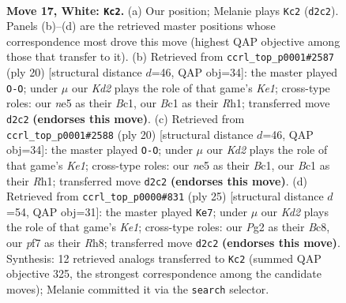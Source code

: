 \documentclass[11pt]{article}
\begin{document}
\clearpage

\begin{figure}[p]\centering
\begin{subfigure}{0.46\textwidth}\centering
\resizebox{\linewidth}{!}{%
\newchessgame
\chessboard[
  setfen={r1b1kb1r/p4p2/4p3/1p1pn1Pp/8/6N1/PP1K2PP/R1B3NR w kq - 0 17},
  showmover=false,
  pgfstyle=straightmove, color=movearrow, markmove={d2-c2}
]}
\caption{}
\end{subfigure}\hfill
\begin{subfigure}{0.46\textwidth}\centering
\resizebox{\linewidth}{!}{%
\newchessgame
\chessboard[
  setfen={r1b1kb1r/p3pppp/1np5/4N3/8/2N5/PPP2PPP/R1B1K2R w KQkq - 0 11},
  showmover=false,
  pgfstyle=straightmove, color=movearrow, markmove={e1-g1}
]}
\caption{}
\end{subfigure}
\\[4pt]
\begin{subfigure}{0.46\textwidth}\centering
\resizebox{\linewidth}{!}{%
\newchessgame
\chessboard[
  setfen={r1b1kb1r/p3pppp/1np5/4N3/8/2N5/PPP2PPP/R1B1K2R w KQkq - 0 11},
  showmover=false,
  pgfstyle=straightmove, color=movearrow, markmove={e1-g1}
]}
\caption{}
\end{subfigure}\hfill
\begin{subfigure}{0.46\textwidth}\centering
\resizebox{\linewidth}{!}{%
\newchessgame
\chessboard[
  setfen={r1b1k2r/pp1n1ppp/4p3/3pP3/3N1P2/8/PPP3PP/R3KB1R b KQkq - 0 13},
  showmover=false,
  pgfstyle=straightmove, color=movearrow, markmove={e8-e7}
]}
\caption{}
\end{subfigure}
\caption{\textbf{Move 17, White: \texttt{Kc2}.} (a) Our position; Melanie plays \texttt{Kc2} (\texttt{d2c2}). Panels (b)--(d) are the retrieved master positions whose correspondence most drove this move (highest QAP objective among those that transfer to it). (b) Retrieved from \texttt{ccrl\_top\_p0001\#2587} (ply 20) [structural distance $d$=46, QAP obj=34]: the master played \texttt{O-O}; under $\mu$ our \emph{Kd2} plays the role of that game's \emph{Ke1}; cross-type roles: our \emph{n}e5 as their \emph{B}c1, our \emph{B}c1 as their \emph{R}h1; transferred move \texttt{d2c2} \textbf{(endorses this move)}. (c) Retrieved from \texttt{ccrl\_top\_p0001\#2588} (ply 20) [structural distance $d$=46, QAP obj=34]: the master played \texttt{O-O}; under $\mu$ our \emph{Kd2} plays the role of that game's \emph{Ke1}; cross-type roles: our \emph{n}e5 as their \emph{B}c1, our \emph{B}c1 as their \emph{R}h1; transferred move \texttt{d2c2} \textbf{(endorses this move)}. (d) Retrieved from \texttt{ccrl\_top\_p0000\#831} (ply 25) [structural distance $d$=54, QAP obj=31]: the master played \texttt{Ke7}; under $\mu$ our \emph{Kd2} plays the role of that game's \emph{Ke1}; cross-type roles: our \emph{P}g2 as their \emph{B}c8, our \emph{p}f7 as their \emph{R}h8; transferred move \texttt{d2c2} \textbf{(endorses this move)}. Synthesis: 12 retrieved analogs transferred to \texttt{Kc2} (summed QAP objective 325, the strongest correspondence among the candidate moves); Melanie committed it via the \texttt{search} selector.}
\label{fig:thought-m32}
\end{figure}
\end{document}
